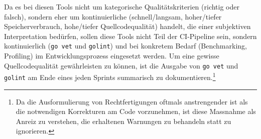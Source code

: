 Da es bei diesen Tools nicht um kategorische Qualitätskriterien (richtig oder falsch), sondern eher um kontinuierliche (schnell/langsam, hoher/tiefer Speicherverbrauch, hohe/tiefer Quellcodequalität) handelt, die einer subjektiven Interpretation bedürfen, sollen diese Tools nicht Teil der CI-Pipeline sein, sondern kontinuierlich (\texttt{go vet} und \texttt{golint}) und bei konkretem Bedarf (Benchmarking, Profiling) im Entwicklungsprozess eingesetzt werden. Um eine gewisse Quellcodequalität gewährleisten zu können, ist die Ausgabe von \texttt{go vet} und \texttt{golint} am Ende eines jeden Sprints summarisch zu dokumentieren.\footnote{Da die Ausformulierung von Rechtfertigungen oftmals anstrengender ist als die notwendigen Korrekturen am Code vorzunehmen, ist diese Massnahme als Anreiz zu verstehen, die erhaltenen Warnungen zu behandeln statt zu ignorieren.}
